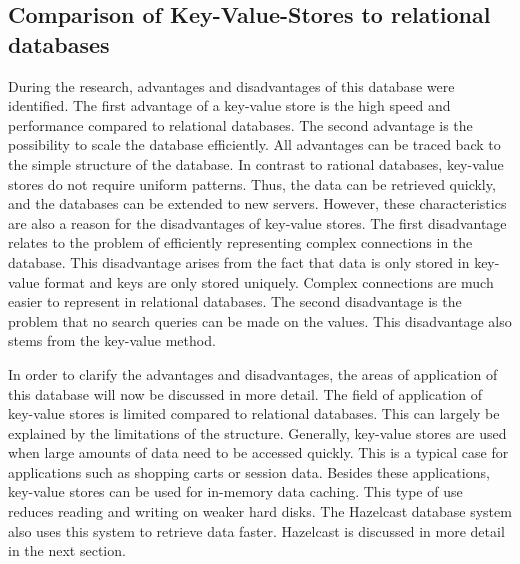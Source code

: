 \subsection{Comparison of Key-Value-Stores to relational databases}

During the research, advantages and disadvantages of this database were
identified. The first advantage of a key-value store is the high speed and
performance compared to relational databases. The second advantage is the
possibility to scale the database efficiently. All advantages can be traced back
to the simple structure of the database. In contrast to rational databases,
key-value stores do not require uniform patterns. Thus, the data can be
retrieved quickly, and the databases can be extended to new servers. However,
these characteristics are also a reason for the disadvantages of key-value
stores. The first disadvantage relates to the problem of efficiently
representing complex connections in the database. This disadvantage arises from
the fact that data is only stored in key-value format and keys are only stored
uniquely. Complex connections are much easier to represent in relational
databases. The second disadvantage is the problem that no search queries can be
made on the values. This disadvantage also stems from the key-value method. 

In order to clarify the advantages and disadvantages, the areas of application of
this database will now be discussed in more detail. The field of application of
key-value stores is limited compared to relational databases. This can largely
be explained by the limitations of the structure. Generally, key-value stores
are used when large amounts of data need to be accessed quickly. This is a
typical case for applications such as shopping carts or session data. Besides
these applications, key-value stores can be used for in-memory data caching.
This type of use reduces reading and writing on weaker hard disks. The Hazelcast
database system also uses this system to retrieve data faster. Hazelcast is
discussed in more detail in the next section.
\parencite{Key_Value_Datastore_Hazelcast, Key_Value_Datastore}